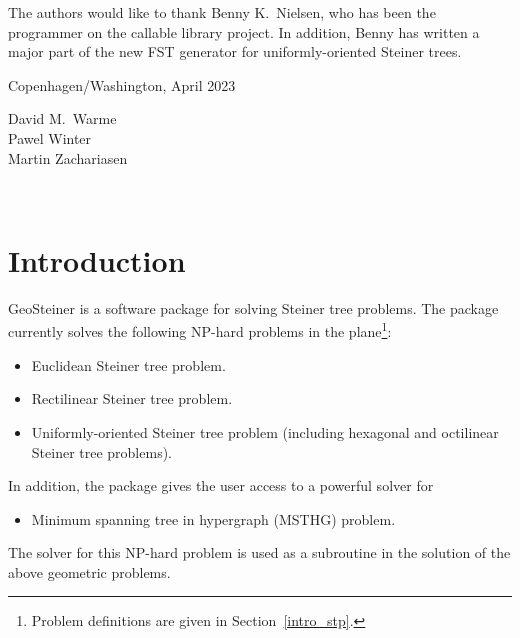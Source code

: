 \documentclass[12pt,twoside,letterpaper]{article}
\def\code#1{{\ttfamily #1}}
\def\geosteiner{Geo\-Steiner}
\begin{document}

The authors would like to thank Benny K.\ Nielsen, who has been the
programmer on the callable library project. In addition, Benny has
written a major part of the new FST generator for uniformly-oriented
Steiner trees.

\bigskip\bigskip\bigskip

\begin{flushright}
Copenhagen/Washington, April 2023

\bigskip\bigskip
David M.\ Warme\\
Pawel Winter\\
Martin Zachariasen

\end{flushright}

\clearpage
\thispagestyle{empty}
~

\clearpage
{}
\section{Introduction}
\label{intro}

\geosteiner{} is a software package for solving Steiner tree
problems. The package currently solves the following NP-hard problems
in the plane\footnote{Problem definitions are given in Section~\ref{intro_stp}.}:  
\begin{itemize}
\item Euclidean Steiner tree problem.
\item Rectilinear Steiner tree problem.
\item Uniformly-oriented Steiner tree problem (including hexagonal
  and octilinear Steiner tree problems).
\end{itemize}
In addition, the package gives the user access to a powerful solver
for 
\begin{itemize}
\item Minimum spanning tree in hypergraph (MSTHG) problem.
\end{itemize}
The solver for this NP-hard problem is used as a subroutine in the
solution of the above geometric problems. 
\end{document}
